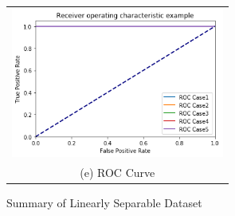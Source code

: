 \begin{figure}[H]
\begin{tabular}{cc}
		
		
		
		\multicolumn{2}{c}{\includegraphics[width=70mm]{./dataset1/roc.png} }\\
		\multicolumn{2}{c}{(e) ROC Curve}
		
	\end{tabular}\hspace*{-1cm}
	\caption{Summary of Linearly Separable Dataset}
\end{figure}